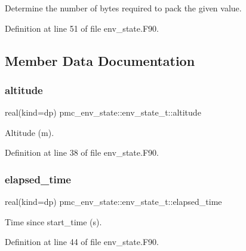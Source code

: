 Determine the number of bytes required to pack the given value. 



Definition at line 51 of file env\+\_\+state.\+F90.



\subsection{Member Data Documentation}
\mbox{\label{structpmc__env__state_1_1env__state__t_abf793f1fce1aa74bc88374880a8473da}} 
\subsubsection{\texorpdfstring{altitude}{altitude}}
{\footnotesize\ttfamily real(kind=dp) pmc\+\_\+env\+\_\+state\+::env\+\_\+state\+\_\+t\+::altitude}



Altitude (m). 



Definition at line 38 of file env\+\_\+state.\+F90.

\mbox{\label{structpmc__env__state_1_1env__state__t_a82191988fb9ecb4eac2b25c9844516bb}} 
\subsubsection{\texorpdfstring{elapsed\+\_\+time}{elapsed\_time}}
{\footnotesize\ttfamily real(kind=dp) pmc\+\_\+env\+\_\+state\+::env\+\_\+state\+\_\+t\+::elapsed\+\_\+time}



Time since {\ttfamily start\+\_\+time} (s). 



Definition at line 44 of file env\+\_\+state.\+F90.


